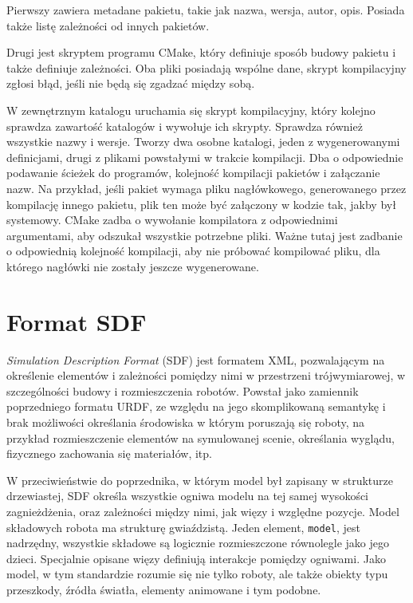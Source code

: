 		Pierwszy zawiera metadane pakietu, takie jak nazwa, wersja, autor, opis.
		Posiada także listę zależności od innych pakietów.
		
		Drugi jest skryptem programu CMake, który definiuje sposób budowy pakietu i także definiuje zależności.
		Oba pliki posiadają wspólne dane, skrypt kompilacyjny zgłosi błąd, jeśli nie będą się zgadzać między sobą.
		
		W zewnętrznym katalogu uruchamia się skrypt kompilacyjny, który kolejno sprawdza zawartość katalogów i wywołuje ich skrypty.
		Sprawdza również wszystkie nazwy i wersje. Tworzy dwa osobne katalogi, jeden z wygenerowanymi definicjami, drugi z plikami powstałymi w trakcie kompilacji.
		Dba o odpowiednie podawanie ścieżek do programów, kolejność kompilacji pakietów i załączanie nazw.
		Na przykład, jeśli pakiet wymaga pliku nagłówkowego, generowanego przez kompilację innego pakietu, plik ten może być załączony w kodzie tak, jakby był systemowy.
		CMake zadba o wywołanie kompilatora z odpowiednimi argumentami, aby odszukał wszystkie potrzebne pliki.
		Ważne tutaj jest zadbanie o odpowiednią kolejność kompilacji, aby nie próbować kompilować pliku, dla którego nagłówki nie zostały jeszcze wygenerowane.

\section{Format SDF}
	\label{sec:sdf}
	\emph{Simulation Description Format} (SDF) \cite{sdf_website} jest formatem XML, pozwalającym na określenie elementów i zależności pomiędzy nimi w przestrzeni trójwymiarowej, 
	w szczególności budowy i rozmieszczenia robotów.
	Powstał jako zamiennik poprzedniego formatu URDF, ze względu na jego skomplikowaną semantykę i brak możliwości określania środowiska w którym poruszają się roboty,
	na przykład rozmieszczenie elementów na symulowanej scenie, określania wyglądu, fizycznego zachowania się materiałów, itp.

	W przeciwieństwie do poprzednika, w którym model był zapisany w strukturze drzewiastej, SDF określa wszystkie ogniwa modelu na tej samej wysokości zagnieżdżenia, 
	oraz zależności między nimi, jak więzy i względne pozycje.
	Model składowych robota ma strukturę gwiaździstą. Jeden element, \texttt{model}, jest nadrzędny, wszystkie składowe są logicznie rozmieszczone równolegle jako jego dzieci.
	Specjalnie opisane więzy definiują interakcje pomiędzy ogniwami.
	Jako model, w tym standardzie rozumie się nie tylko roboty, ale także obiekty typu przeszkody, źródła światła, elementy animowane i tym podobne.

